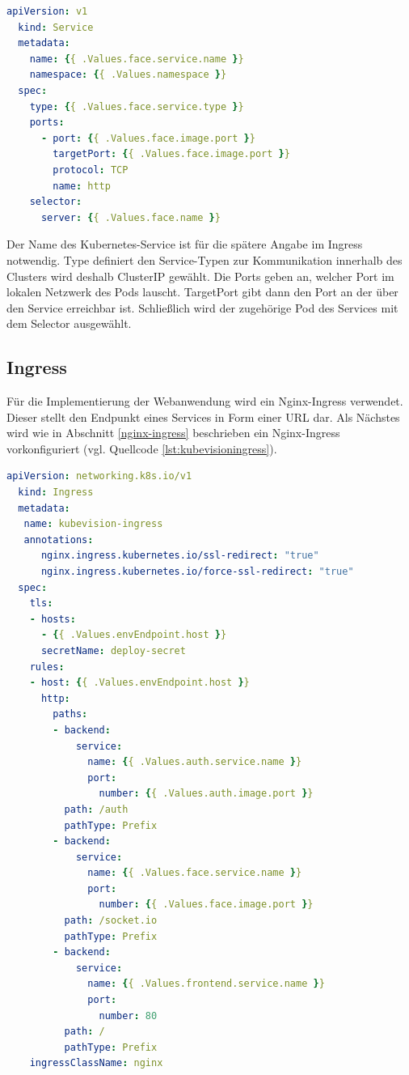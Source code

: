 \begin{lstlisting}[caption={face-service.yaml},captionpos=b,label={lst:face-service},language=yaml]
  apiVersion: v1
  kind: Service
  metadata:
    name: {{ .Values.face.service.name }}
    namespace: {{ .Values.namespace }}
  spec:
    type: {{ .Values.face.service.type }}
    ports:
      - port: {{ .Values.face.image.port }}
        targetPort: {{ .Values.face.image.port }}
        protocol: TCP
        name: http
    selector:
      server: {{ .Values.face.name }}

\end{lstlisting}

Der Name des Kubernetes-Service ist für die spätere Angabe im Ingress notwendig.
Type definiert den Service-Typen zur Kommunikation innerhalb des Clusters wird deshalb ClusterIP gewählt.
Die Ports geben an, welcher Port im lokalen Netzwerk des Pods lauscht.
TargetPort gibt dann den Port an der über den Service erreichbar ist.
Schließlich wird der zugehörige Pod des Services mit dem Selector ausgewählt.


\subsection{Ingress}

Für die Implementierung der Webanwendung wird ein Nginx-Ingress verwendet.
Dieser stellt den Endpunkt eines Services in Form einer URL dar.
Als Nächstes wird wie in Abschnitt \ref{nginx-ingress} beschrieben ein Nginx-Ingress vorkonfiguriert (vgl. Quellcode \ref{lst:kubevisioningress}).


\begin{lstlisting}[caption={kubevision-ingress.yaml},captionpos=b,label={lst:kubevisioningress},language=yaml]
  apiVersion: networking.k8s.io/v1
  kind: Ingress
  metadata:
   name: kubevision-ingress
   annotations:
      nginx.ingress.kubernetes.io/ssl-redirect: "true"
      nginx.ingress.kubernetes.io/force-ssl-redirect: "true"
  spec:
    tls:
    - hosts:
      - {{ .Values.envEndpoint.host }}
      secretName: deploy-secret
    rules:
    - host: {{ .Values.envEndpoint.host }}
      http:
        paths:
        - backend:
            service:
              name: {{ .Values.auth.service.name }}
              port:
                number: {{ .Values.auth.image.port }}
          path: /auth
          pathType: Prefix
        - backend:
            service:
              name: {{ .Values.face.service.name }}
              port:
                number: {{ .Values.face.image.port }}
          path: /socket.io
          pathType: Prefix
        - backend:
            service:
              name: {{ .Values.frontend.service.name }}
              port:
                number: 80
          path: /
          pathType: Prefix
    ingressClassName: nginx

\end{lstlisting}

